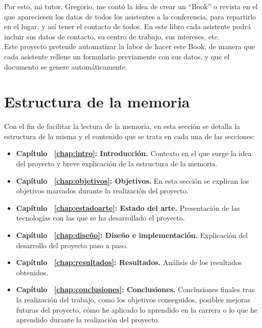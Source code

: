 \documentclass[a4paper, 12pt]{book}
\begin{document}
Por esto, mi tutor, Gregorio, me contó la idea de crear un ``Book'' o revista en el que apareciesen los datos de todos los asistentes a la conferencia, para repartirlo en el lugar, y así tener el contacto de todos. En este libro cada asistente podrá incluir sus datos de contacto, su centro de trabajo, sus intereses, etc.\\

Este proyecto pretende automatizar la labor de hacer este Book, de manera que cada asistente rellene un formulario previamente con sus datos, y que el documento se genere automáticamente.


\section{Estructura de la memoria}
\label{sec:estructura}
Con el fin de facilitar la lectura de la memoria, en esta sección se detalla la estructura de la misma y el contenido que se trata en cada una de las secciones:
\begin{itemize}
  \item \textbf{Capítulo ~\ref{chap:intro}: Introducción.} Contexto en el que surge la idea del proyecto y breve explicación de la estructura de la memoria.

  \item \textbf{Capítulo ~\ref{chap:objetivos}: Objetivos.} En esta sección se explican los objetivos marcados durante la realización del proyecto.

  \item \textbf{Capítulo ~\ref{chap:estadoarte}: Estado del arte.} Presentación de las tecnologías con las que se ha desarrollado el proyecto.
  
  \item \textbf{Capítulo ~\ref{chap:diseño}: Diseño e implementación.} Explicación del desarrollo del proyecto paso a paso.

  \item \textbf{Capítulo ~\ref{chap:resultados}: Resultados.} Análisis de los resultados obtenidos.
  
  \item \textbf{Capítulo ~\ref{chap:conclusiones}: Conclusiones.} Conclusiones finales tras la realización del trabajo, como los objetivos conseguidos, posibles mejoras futuras del proyecto, cómo he aplicado lo aprendido en la carrera o lo que he aprendido durante la realización del proyecto.
\end{itemize}
\end{document}
